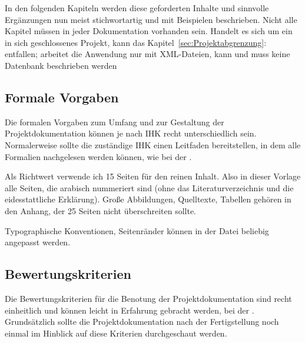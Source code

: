 In den folgenden Kapiteln werden diese geforderten Inhalte und sinnvolle Ergänzungen nun meist stichwortartig und \ggfs mit
Beispielen beschrieben. Nicht alle Kapitel müssen in jeder Dokumentation vorhanden sein. Handelt es sich \bspw um ein in sich
geschlossenes Projekt, kann das Kapitel~\ref{sec:Projektabgrenzung}:  entfallen; arbeitet die
Anwendung nur mit XML-Dateien, kann und muss keine Datenbank beschrieben werden \usw


\subsection*{Formale Vorgaben}

Die formalen Vorgaben zum Umfang und zur Gestaltung der Projektdokumentation können je nach IHK recht unterschiedlich sein.
Normalerweise sollte die zuständige IHK einen Leitfaden bereitstellen, in dem alle Formalien nachgelesen werden können,
wie \zB bei der \citet{MerkblattIHK}.

Als Richtwert verwende ich 15 Seiten für den reinen Inhalt. Also in dieser Vorlage alle Seiten, die arabisch nummeriert
sind (ohne das Literaturverzeichnis und die eidesstattliche Erklärung).
Große Abbildungen, Quelltexte, Tabellen \usw gehören in den Anhang, der 25 Seiten nicht überschreiten sollte.

Typographische Konventionen, Seitenränder \usw können in der Datei  beliebig angepasst werden.


\subsection*{Bewertungskriterien}
Die Bewertungskriterien für die Benotung der Projektdokumentation sind recht einheitlich und können leicht in Erfahrung
gebracht werden, \zB bei der \citet{BewertungsmatrikIHK}.
Grundsätzlich sollte die Projektdokumentation nach der Fertigstellung noch einmal im Hinblick auf diese Kriterien durchgeschaut werden.
